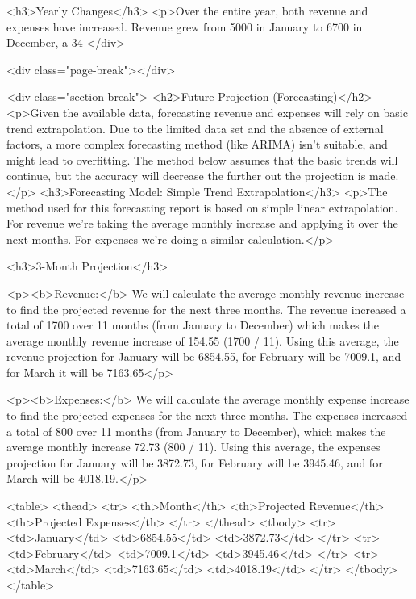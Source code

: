 {    
        <h3>Yearly Changes</h3>
        <p>Over the entire year, both revenue and expenses have increased. Revenue grew from 5000 in January to 6700 in December, a 34%
    </div>

    <div class="page-break"></div>

    <div class="section-break">
        <h2>Future Projection (Forecasting)</h2>
        <p>Given the available data, forecasting revenue and expenses will rely on basic trend extrapolation. Due to the limited data set and the absence of external factors, a more complex forecasting method (like ARIMA) isn't suitable, and might lead to overfitting. The method below assumes that the basic trends will continue, but the accuracy will decrease the further out the projection is made.</p>
        <h3>Forecasting Model: Simple Trend Extrapolation</h3>
        <p>The method used for this forecasting report is based on simple linear extrapolation. For revenue we're taking the average monthly increase and applying it over the next months. For expenses we're doing a similar calculation.</p>

    <h3>3-Month Projection</h3>
    
    <p><b>Revenue:</b> We will calculate the average monthly revenue increase to find the projected revenue for the next three months. The revenue increased a total of 1700 over 11 months (from January to December) which makes the average monthly revenue increase of 154.55 (1700 / 11). Using this average, the revenue projection for January will be 6854.55, for February will be 7009.1, and for March it will be 7163.65</p>

    <p><b>Expenses:</b> We will calculate the average monthly expense increase to find the projected expenses for the next three months. The expenses increased a total of 800 over 11 months (from January to December), which makes the average monthly increase 72.73 (800 / 11). Using this average, the expenses projection for January will be 3872.73, for February will be 3945.46, and for March will be 4018.19.</p>
     
      <table>
        <thead>
          <tr>
             <th>Month</th>
             <th>Projected Revenue</th>
             <th>Projected Expenses</th>
          </tr>
        </thead>
        <tbody>
          <tr>
              <td>January</td>
              <td>6854.55</td>
              <td>3872.73</td>
           </tr>
            <tr>
              <td>February</td>
              <td>7009.1</td>
              <td>3945.46</td>
           </tr>
            <tr>
              <td>March</td>
              <td>7163.65</td>
              <td>4018.19</td>
           </tr>
        </tbody>
      </table>
      
}
